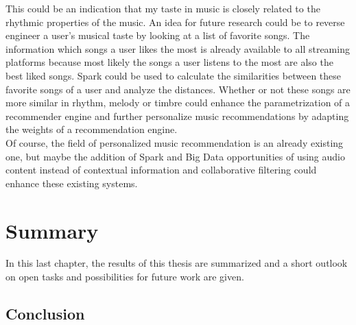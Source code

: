 \noindent This could be an indication that my taste in music is closely related to the rhythmic properties of the music. 
An idea for future research could be to reverse engineer a user's musical taste by looking at a list of favorite songs. The information which songs a user likes the most is already available to all streaming platforms because most likely the songs a user listens to the most are also the best liked songs. Spark could be used to calculate the similarities between these favorite songs of a user and analyze the distances. Whether or not these songs are more similar in rhythm, melody or timbre could enhance the parametrization of a recommender engine and further personalize music recommendations by adapting the weights of a recommendation engine.\\
Of course, the field of personalized music recommendation is an already existing one, but maybe the addition of Spark and Big Data opportunities of using audio content instead of contextual information and collaborative filtering could enhance these existing systems. 

\chapter{Summary}\label{summarych}

In this last chapter, the results of this thesis are summarized and a short outlook on open tasks and possibilities for future work are given. 

\section{Conclusion}

